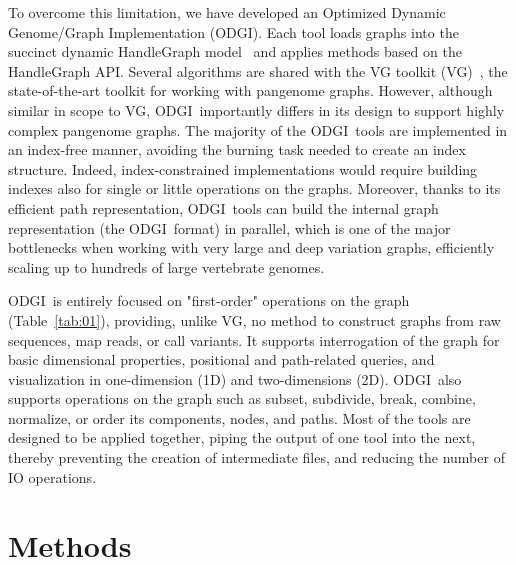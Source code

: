 \documentclass{bioinfo}
\newcommand{\odgi}{ODGI}
\begin{document}
    To overcome this limitation, we have developed an Optimized Dynamic Genome/Graph Implementation (ODGI). Each tool
    loads graphs into the succinct dynamic HandleGraph model~\citep{33040146} and applies methods based on the
    HandleGraph API. Several algorithms are shared with the VG toolkit (VG)~\citep{30125266}, the state-of-the-art
    toolkit for working with pangenome graphs. However, although similar in scope to VG, \odgi\ importantly differs in
    its design to support highly complex pangenome graphs. The majority of the \odgi\ tools are implemented in an
    index-free manner, avoiding the burning task needed to create an index structure. Indeed, index-constrained
    implementations would require building indexes also for single or little operations on the graphs. Moreover,
    thanks to its efficient path representation, \odgi\ tools can build the internal graph representation (the \odgi\
    format) in parallel, which is one of the major bottlenecks when working with very large and deep variation graphs,
    efficiently scaling up to hundreds of large vertebrate genomes.


    \odgi\ is entirely focused on "first-order" operations on the graph
    (Table~\ref{tab:01}), providing, unlike VG, no method to construct
    graphs from raw sequences, map reads, or call variants. It
    supports interrogation of the graph for basic dimensional
    properties, positional and path-related queries, and visualization
    in one-dimension (1D) and two-dimensions (2D). \odgi\ also supports
    operations on the graph such as subset, subdivide, break, combine,
    normalize, or order its components, nodes, and paths. Most of the
    tools are designed to be applied together, piping the output of
    one tool into the next, thereby preventing the creation of
    intermediate files, and reducing the number of IO operations.

    \section{Methods}
\end{document}
